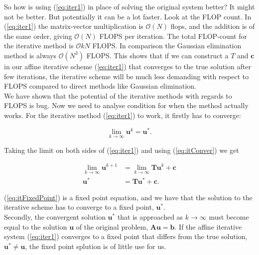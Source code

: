 \documentclass{article}
\begin{document}
So how is using (\ref{eq:iter1}) in place of solving the original system better? It might not be better. But potentially it can be a lot faster. Look at the FLOP count. In (\ref{eq:iter1}) the matrix-vector multiplication is $\mathcal{O}(N)$ flops, and the addition is of the same order, giving $\mathcal{O}(N)$ FLOPS per iteration. The total FLOP-count for the iterative method is $\mathcal{O}{kN}$ FLOPS. In comparison the Gaussian elimination method is always $\mathcal{O}(N^3)$ FLOPS. This shows that if we can construct a $T$ and $\mathbf{c}$ in our affine iterative scheme (\ref{eq:iter1}) that converges to the true solution after few iterations, the iterative scheme will be much less demanding with respect to FLOPS compared to direct methods like Gaussian elimination.\\

We have shown that the potential of the iterative methods with regards to FLOPS is bug. Now we need to analyse condition for when the method actually works. For the iterative method (\ref{eq:iter1}) to work, it firstly has to converge: 

\begin{equation}\label{eq:itConver}
	\lim_{k \rightarrow \infty} \mathbf{u}^{k} = \mathbf{u}^{*}.
\end{equation}

Taking the limit on both sides of (\ref{eq:iter1}) and using (\ref{eq:itConver}) we get

\begin{subequations}
	\begin{align}
			\lim_{k \rightarrow \infty} \mathbf{u}^{k+1} &= 	\lim_{k \rightarrow \infty} \mathbf{T} \mathbf{u}^k + \mathbf{c}\\
			\mathbf{u}^{*} &= \mathbf{T} \mathbf{u}^{*} + \mathbf{c}.\label{eq:itFixedPoint}
	\end{align}
\end{subequations}

(\ref{eq:itFixedPoint}) is a fixed point equation, and we have that the solution to the iterative scheme has to converge to a fixed point, $\mathbf{u^{*}}$.\\
 
Secondly, the convergent solution $\mathbf{u}^{*}$ that is approached  as $k \rightarrow \infty$ must become equal to the solution $\mathbf{u}$ of the original problem, $\mathbf{A}\mathbf{u} = \mathbf{b}$. If the affine iterative system (\ref{eq:iter1}) converges to a fixed point that differs from the true solution, $\mathbf{u}^{*} \neq \mathbf{u}$, the fixed point splution is of little use for us.\\
\end{document}
